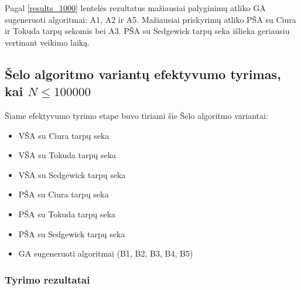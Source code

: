 \documentclass{VUMIFInfKursinis}
\begin{document}
Pagal \ref{results_1000} lentelės rezultatus
mažiausiai palyginimų atliko GA sugeneruoti algoritmai: A1, A2 ir A5.
Mažiausiai priskyrimų atliko PŠA su Ciura ir Tokuda tarpų sekomis bei A3.
PŠA su Sedgewick tarpų seka išlieka geriausiu vertinant veikimo laiką.

\subsection{Šelo algoritmo variantų efektyvumo tyrimas, kai $N \leq 100000$}

Šiame efektyvumo tyrimo etape buvo tiriami šie Šelo algoritmo variantai:
\begin{itemize}
  \item VŠA su Ciura tarpų seka
  \item VŠA su Tokuda tarpų seka
  \item VŠA su Sedgewick tarpų seka
  \item PŠA su Ciura tarpų seka
  \item PŠA su Tokuda tarpų seka
  \item PŠA su Sedgewick tarpų seka
  \item GA sugeneruoti algoritmai (B1, B2, B3, B4, B5)
\end{itemize}

\subsubsection{Tyrimo rezultatai}
\end{document}
